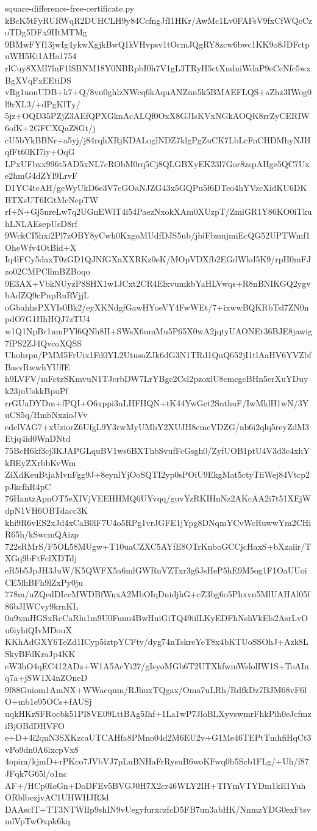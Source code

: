 \documentclass[11pt]{article}
\theoremstyle{definition}
\theoremstyle{remark}
\begin{document}
\begin{filecontents*}[overwrite]{square-difference-free-certificate.py}
kBcK5tFyRURWqR2DUHCLH9y84CcfngJfI1HKr/AwMc1Lv0FAFsV9fxCfWQcCzoTDg5DFx9HtMTMg
9BMwFYf13jwIg4ykwXgjkBwQ1kVHvpsv1tOcmJQgRY8zcw6bwc1KK9o8JDFctpuWH5Ki1AHa1754
rlCuy8XMI7lnF1lSBNM18Y0NBRpbI0h7V1gL3TRyH5ctXndniWdaP9eCcNfc5wxBgXVqFxEEtiDS
vRg1uouUDB+k7+Q/8vn0ghlzNWcq6kAquANZun5k5BMAEFLQS+aZhz3IWog0l9rXL3/+dPgKlTy/
5jz+OQD35PZjZ3AEfQPXGknAcALQf0OxX8GJIsKVxNGkAOQK8rrZyCERIW6ofK+2GFCXQaZ8Gt/j
cU5bYkBBNr+a5yj/j84rqhXRjKDALoglNDZ7klgPgZuCK7LbLcFnCHDMhyNJHqfFt60KI7iy+OqG
LPxUFbxx996t5AD5xNL7cRObM0rq5Cj8QLGBXyEK23l7Gor8zspAHge5QC7Uxe2hmG4dZYl9LrvF
D1YC4teAH/geWyUkD6e3V7cGOaNJZG43x5GQPu5f6DTeo4hYVzcXidKU6DKBTXsUT6IGtMcNepTW
rf+N+Gj5nreLw7q2UGnEWlT4i54PaezNxokXAm0XUzpT/ZmiGR1Y86KO0iTkuhLNLAEsepUsD8rf
9WckCI5hxi2Pl7zOBY8yCwh0KxgoMUdfDJS5ub/jbiFbzmjmiEcQG52UPTWmf1OheWfv4OtBid+X
Iq4lFCy5daxT0zGD1QJNfGXaXXRKz0eK/MOpVDXfb2EGdWkd5K9/rpH0mFJzo02CMPCllmBZBoqo
9E3AX+VbkNUyzP8SHX1w1JCxt2CR4ElxvumkbYaHLVwqs+R8nBNIKGQ2ygvbAdZQ9cPnpRuRVjjL
oGbahhsPXYIs0Bk2/eyXKNdgfGawHYoeVY4FwWEt/7+ixwwBQKRbTsl7ZN0npdO7G1HhHQJ7zTU4
w1Q1NpBr1nmPYl6QNh8H+SWsX6umMu5P65X0wA2jqtyUAONEt36BJE8jawig7fPS2ZJ4QvcoXQSS
Uhohrpn/PMM5FrUix1Fd0YL2UtusoZJk6dG3N1TRd1QuQ652jI1tlAaHV6YVZbfBasvRwwhYUffE
h9LVFV/mFctzSKmvuN1TJcrbDW7LrYBgc2Csl2pzoxlU8cmcgcBHn5erXuYDuyk23juUskkBpuPf
rrGUaDYDm+fPQI+O6xppi3uLHFHQN+tK44YwGct2SnthuF/IwMklH1wN/3YuCS5q/HmbNxzioJVv
edclVAG7+xUziorZ6UfgL9Y3rwMyUMhY2XUJH8cmcVDZG/nb6i2qlq5reyZdM3Etjq4id0WnDNtd
75BcH6kf3cj3KJAPGLquBV1ws6BXThbSvufFcGsgh0/ZyfUOB1ptU4V3d3c4xhYkBEyZXrbbKvWm
ZiXdKeuBtjaMvnFgg9J+8eynlYjOoSQTI2yp0sPOiU9EkgMat5ctyTiiWej84Vtcp2pJkcfhR4pC
76HantzApnOT5eXIVjVEEHHMQ6UYvqq/guvYzRKIHnNz2AKcAA2i7t51XEjWdpN1VH6OBTdacc3K
khi9R6vES2xJd4xCaB0lF7U4o5RPg1vrJGFE1jYpg8DNqmYCvWcRuwwYm2CHiR65h/kSwcmQAizp
722sRMrS/F5OL58MUgw+T10uaCZXC5AYfE8OTrKnboGCCjcHaxS+bXzaiir/TXGq9bFtFclXDTdj
eR5b5JpJH3JuW/K5QWFX5a6mlGWRuVZTxr3g6JsHeP5hE9M5og1F1OaUUoiCE5lhBFh9lZxPy0ju
778m/uZQedDIceMWDBfWnxA2MbOIqDnidjhG+cZ3bg6o5Phxvn5MlUAHAl05f86bJIWCvy9krnKL
0u9xmHGSxRcCaRlu1m9U0Funu4BwHuiGiTQ49iilLKyEDFhNshVkEls2AsrLvOu6iyhiQIvMDouX
KKhAdGXY6TeZd1ICyp5iztpYCFty/dyg74nTskreYeT8x4bKTUoSSOhJ+Azk8LSkyBFdKraJp4KK
eW3hO4qEC412ADz+W1A5AcYi27/gIsyoMGb6T2UTXkfwmWslolIW1S+ToAInq7a+jSW1X4nZOneD
9f88Guiom1AmNX+WWacqnm/RJhuxTQgax/Oma7uLRh/RdfkDz7BJM68vF6lO+mb1e95OCs+fAUSj
uqkHKrSFRocbk51PI8VE09LttBAg5Ihf+1La1wP7JloBLXyvswmrFhkPih0eJcfmziBjOBdDHVFO
e+D+4i2qnN3SXKzcaUTCAHfa8PMno04d2M6EU2v+G1Me46TEPtTmhfiHqCt3vPo9dn0A6lxcpVx8
4opim/kjmD+rPKco7JVbVJ7pLuBNHaFrRysuB6woKFwq0b5Scb1FLg/+Uh/f87JFqk7G65l/o1nc
AF+/HCp0IoGn+DoDFEv5BVGJ0H7X2cr46WLY2IH+TIYmVTYDm1kE1YuhORblbezjvAC1UHWHJR3d
DAAsclT+TT3NTWlIp9shIN9vUegyfurxczfcD5FB7un3abHK/NnmzYDG0exFtsvmlVpTwOxpk6kq

\end{filecontents*}
\end{document}
